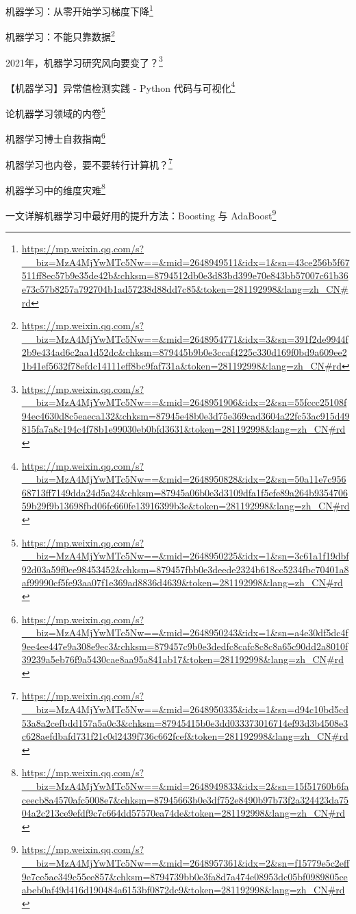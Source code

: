 \documentclass[]{ctexbook}
\renewcommand{\href}[2]{#2\footnote{\url{#1}}}
\begin{document}
\href{https://mp.weixin.qq.com/s?__biz=MzA4MjYwMTc5Nw==\&mid=2648949511\&idx=1\&sn=43ce256b5f67511ff8ec57b9e35de42b\&chksm=8794512db0e3d83bd399e70e843bb57007c61b36e73c57b8257a792704b1ad57238d88dd7c85\&token=281192998\&lang=zh_CN\#rd}{机器学习：从零开始学习梯度下降}

\href{https://mp.weixin.qq.com/s?__biz=MzA4MjYwMTc5Nw==\&mid=2648954771\&idx=3\&sn=391f2de9944f2b9e434ad6c2aa1d52dc\&chksm=879445b9b0e3ccaf4225c330d169f0bd9a609ee21b41ef5632f78efdc14111eff8bc9faf731a\&token=281192998\&lang=zh_CN\#rd}{机器学习：不能只靠数据}

\href{https://mp.weixin.qq.com/s?__biz=MzA4MjYwMTc5Nw==\&mid=2648951906\&idx=2\&sn=55fccc25108f94ec4630d8c5eaeca132\&chksm=87945e48b0e3d75e369cad3604a22fc53ac915d49815fa7a8c194c4f78b1e99030eb0bfd3631\&token=281192998\&lang=zh_CN\#rd}{2021年，机器学习研究风向要变了？}

\href{https://mp.weixin.qq.com/s?__biz=MzA4MjYwMTc5Nw==\&mid=2648950828\&idx=2\&sn=50a11e7c95668713ff7149dda24d5a24\&chksm=87945a06b0e3d3109dfa1f5efe89a264b935470659b29f9b13698fbd06fc660fe13916399b3e\&token=281192998\&lang=zh_CN\#rd}{【机器学习】异常值检测实践 - Python 代码与可视化}

\href{https://mp.weixin.qq.com/s?__biz=MzA4MjYwMTc5Nw==\&mid=2648950225\&idx=1\&sn=3c61a1f19dbf92d03a59f0ce98453452\&chksm=879457fbb0e3deede2324b618cc5234fbc70401a8af99990cf5fe93aa07f1e369ad8836d4639\&token=281192998\&lang=zh_CN\#rd}{论机器学习领域的内卷}

\href{https://mp.weixin.qq.com/s?__biz=MzA4MjYwMTc5Nw==\&mid=2648950243\&idx=1\&sn=a4e30df5dc4f9ee4ee447e9a308e9ec3\&chksm=879457c9b0e3dedfc8cafc8c8c8a65c90dd2a8010f39239a5eb76f9a5430cae8aa95a841ab17\&token=281192998\&lang=zh_CN\#rd}{机器学习博士自救指南}

\href{https://mp.weixin.qq.com/s?__biz=MzA4MjYwMTc5Nw==\&mid=2648950335\&idx=1\&sn=d94c10bd5cd53a8a2cefbdd157a5a0c3\&chksm=87945415b0e3dd033373016714ef93d3b4508e3c628aefdbafd731f21c0d2439f736c662fcef\&token=281192998\&lang=zh_CN\#rd}{机器学习也内卷，要不要转行计算机？}

\href{https://mp.weixin.qq.com/s?__biz=MzA4MjYwMTc5Nw==\&mid=2648949833\&idx=2\&sn=15f51760b6faceecb8a4570afc5008e7\&chksm=87945663b0e3df752e8490b97b73f2a324423da7504a2c213ce9efdf9c7c664dd57570ea74de\&token=281192998\&lang=zh_CN\#rd}{机器学习中的维度灾难}

\href{https://mp.weixin.qq.com/s?__biz=MzA4MjYwMTc5Nw==\&mid=2648957361\&idx=2\&sn=f15779e5c2eff9e7ce5ae349c55ee857\&chksm=8794739bb0e3fa8d7a474e08953dc05bf0989805ceabeb0af49d416d190484a6153bf0872dc9\&token=281192998\&lang=zh_CN\#rd}{一文详解机器学习中最好用的提升方法：Boosting 与 AdaBoost}
\end{document}
